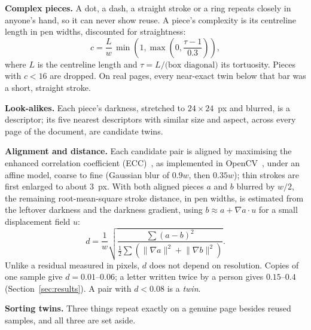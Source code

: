 \documentclass[conference]{IEEEtran}
\begin{document}
\textbf{Complex pieces.} A dot, a dash, a straight stroke or a ring repeats closely in anyone's hand, so it can never
show reuse. A piece's complexity is its centreline length in pen widths, discounted for straightness:
\begin{equation}
c = \frac{L}{w}\,\min\!\left(1, \max\!\left(0, \frac{\tau - 1}{0.3}\right)\right),
\end{equation}
where $L$ is the centreline length and $\tau = L/\text{(box diagonal)}$ its tortuosity. Pieces with $c < 16$ are
dropped. On real pages, every near-exact twin below that bar was a short, straight stroke.

\textbf{Look-alikes.} Each piece's darkness, stretched to $24\times24$~px and blurred, is a descriptor; its five nearest
descriptors with similar size and aspect, across every page of the document, are candidate twins.

\textbf{Alignment and distance.} Each candidate pair is aligned by maximising the enhanced correlation coefficient
(ECC)~\cite{evangelidis2008ecc}, as implemented in OpenCV~\cite{bradski2000opencv}, under an affine model, coarse to
fine (Gaussian blur of $0.9w$, then $0.35w$); thin strokes are first enlarged to about 3~px. With both aligned pieces
$a$ and $b$ blurred by $w/2$, the remaining root-mean-square stroke distance, in pen widths, is estimated from the
leftover darkness and the darkness gradient, using $b \approx a + \nabla a \cdot u$ for a small displacement field $u$:
\begin{equation}
d = \frac{1}{w}\sqrt{\frac{\sum (a-b)^2}{\tfrac12\sum\left(\lVert\nabla a\rVert^2 + \lVert\nabla b\rVert^2\right)}}.
\end{equation}
Unlike a residual measured in pixels, $d$ does not depend on resolution. Copies of one sample give $d = 0.01$--$0.06$;
a letter written twice by a person gives $0.15$--$0.4$ (Section~\ref{sec:results}). A pair with $d < 0.08$ is a
\emph{twin}.

\textbf{Sorting twins.} Three things repeat exactly on a genuine page besides reused samples, and all three are set aside.
\end{document}
